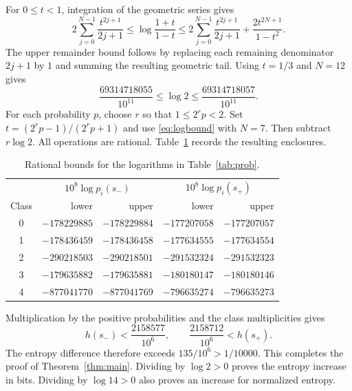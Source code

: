 \documentclass[11pt,a4paper]{article}
\begin{document}
For $0\leq t<1$, integration of the geometric series gives
\begin{equation}\label{eq:logbound}
 2\sum_{j=0}^{N-1}\frac{t^{2j+1}}{2j+1}
 \leq\log\frac{1+t}{1-t}
 \leq2\sum_{j=0}^{N-1}\frac{t^{2j+1}}{2j+1}
       +\frac{2t^{2N+1}}{1-t^2}.
\end{equation}
The upper remainder bound follows by replacing each remaining denominator
$2j+1$ by $1$ and summing the resulting geometric tail.
Using $t=1/3$ and $N=12$ gives
\[
 \frac{69314718055}{10^{11}}\leq\log2\leq
 \frac{69314718057}{10^{11}}.
\]
For each probability $p$, choose $r$ so that $1\leq2^r p<2$.
Set $t=(2^r p-1)/(2^r p+1)$ and use \eqref{eq:logbound} with $N=7$.
Then subtract $r\log2$. All operations are rational.
Table~\ref{tab:logs} records the resulting enclosures.
\begin{table}[htbp]\centering\small
\begin{tabular}{@{}crrrr@{}}\toprule
&\multicolumn{2}{c}{$10^8\log p_i(s_-)$}&\multicolumn{2}{c}{$10^8\log p_i(s_+)$}\\
Class & lower & upper & lower & upper\\\midrule
0&$-178229885$&$-178229884$&$-177207058$&$-177207057$\\
1&$-178436459$&$-178436458$&$-177634555$&$-177634554$\\
2&$-290218503$&$-290218501$&$-291532324$&$-291532323$\\
3&$-179635882$&$-179635881$&$-180180147$&$-180180146$\\
4&$-877041770$&$-877041769$&$-796635274$&$-796635273$\\\bottomrule
\end{tabular}
\caption{Rational bounds for the logarithms in Table~\ref{tab:prob}.}
\label{tab:logs}\end{table}
Multiplication by the positive probabilities and the class multiplicities gives
\[
 h(s_-)<\frac{2158577}{10^6},\qquad
 \frac{2158712}{10^6}<h(s_+).
\]
The entropy difference therefore exceeds $135/10^6>1/10000$. This completes the proof
of Theorem~\ref{thm:main}. Dividing by $\log2>0$ proves the entropy increase
in bits. Dividing by $\log14>0$ also proves an increase for normalized entropy.
\end{document}
